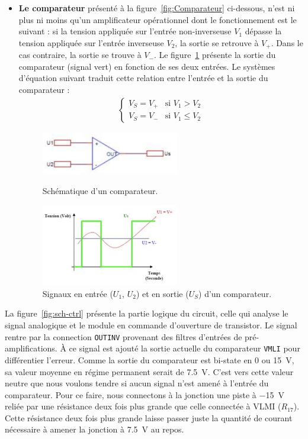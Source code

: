 \documentclass[10pt, oneside, a4paper]{article}
\begin{document}
\begin{itemize}
\item \noindent\textbf{Le comparateur} présenté à la figure~\ref{fig:Comparateur} ci-dessous, n'est ni plus ni moins qu'un amplificateur opérationnel dont le fonctionnement est le suivant : si la tension appliquée sur l'entrée non-inverseuse $V_1$ dépasse la tension appliquée sur l'entrée inverseuse $V_2$, la sortie se retrouve à $V_+$.
Dans le cas contraire, la sortie se trouve à $V_-$.
Le figure~\ref{fig:Comparateur_Graphe} présente la sortie du comparateur (signal vert) en fonction de ses deux entrées.
Le systèmes d'équation suivant traduit cette relation entre l'entrée et la sortie du comparateur :
\begin{align}
\begin{cases}
    V_S = V_+ &\text{si } V_{1} > V_2 \\
    V_S = V_- &\text{si } V_{1} \leq V_2
\end{cases}
\end{align}
\begin{figure}[!ht]
    \centering
    \includegraphics[width=6cm]{image/comparateur.png}
    \caption{Schématique d'un comparateur.}
    \label{fig:Comparateur}
    \centering
    \includegraphics[width=6cm]{image/Graphe_Comparateur.png}
    \caption{Signaux en entrée ($U_1$, $U_2$) et en sortie ($U_S$) d'un comparateur.}
    \label{fig:Comparateur_Graphe}
\end{figure}
\end{itemize}
La figure~\ref{fig:sch-ctrl} présente la partie logique du circuit, celle qui analyse le signal analogique et le module en commande d'ouverture de transistor.
Le signal rentre par la connection \texttt{OUTINV} provenant des filtres d'entrées de pré-amplifications.
À ce signal est ajouté la sortie actuelle du comparateur \texttt{VMLI} pour différentier l'erreur.
Comme la sortie du comparateur est bi-state en 0 ou \SI{15}{\volt}, sa valeur moyenne en régime permanent serait de \SI{7.5}{\volt}.
C'est vers cette valeur \og{}neutre\fg{} que nous voulons tendre si aucun signal n'est amené à l'entrée du comparateur.
Pour ce faire, nous connectons à la jonction une piste à \SI{-15}{\volt} reliée par une résistance deux fois plus grande que celle connectée à VLMI ($R_{17}$).
Cette résistance deux fois plus grande laisse passer juste la quantité de courant nécessaire à amener la jonction à \SI{7.5}{\volt} au repos.
\end{document}
